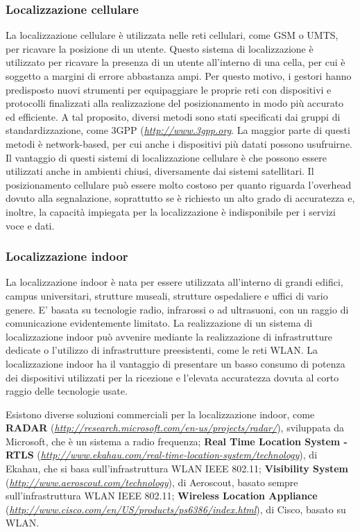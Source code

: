 \subsubsection{Localizzazione cellulare}
La localizzazione cellulare è utilizzata nelle reti cellulari, come GSM o UMTS, per ricavare la posizione di un utente.
Questo sistema di localizzazione è utilizzato per ricavare la presenza di un utente all'interno di una cella, per cui è soggetto a margini di errore abbastanza ampi.
Per questo motivo, i gestori hanno predisposto nuovi strumenti per equipaggiare le proprie reti con dispositivi e protocolli finalizzati alla realizzazione del posizionamento in modo più accurato ed efficiente.
A tal proposito, diversi metodi sono stati specificati dai gruppi di standardizzazione, come 3GPP (\emph{\url{http://www.3gpp.org}}. La maggior parte di questi metodi è network-based, per cui anche i dispositivi più datati possono usufruirne.
Il vantaggio di questi sistemi di localizzazione cellulare è che possono essere utilizzati anche in ambienti chiusi, diversamente dai sistemi satellitari.
Il posizionamento cellulare può essere molto costoso per quanto riguarda l'overhead dovuto alla segnalazione, soprattutto se è richiesto un alto grado  di accuratezza e, inoltre, la capacità impiegata per la localizzazione è indisponibile per i servizi voce e dati.

\subsubsection{Localizzazione indoor}
La localizzazione indoor è nata per essere utilizzata all'interno di grandi edifici, campus universitari, strutture museali, strutture ospedaliere e uffici di vario genere.
E' basata su tecnologie radio, infrarossi o ad ultrasuoni, con un raggio di comunicazione evidentemente limitato.
La realizzazione di un sistema di localizzazione indoor può avvenire mediante la realizzazione di infrastrutture dedicate o l'utilizzo di infrastrutture preesistenti, come le reti WLAN.
La localizzazione indoor ha il vantaggio di presentare un basso consumo di potenza dei dispositivi utilizzati per la ricezione e l'elevata accuratezza dovuta al corto raggio delle tecnologie usate.

Esistono diverse soluzioni commerciali per la localizzazione indoor, come \textbf{RADAR} (\emph{\url{http://research.microsoft.com/en-us/projects/radar/}}), sviluppata da Microsoft, che è un sistema a radio frequenza; \textbf{Real Time Location System - RTLS} (\emph{\url{http://www.ekahau.com/real-time-location-system/technology}}), di Ekahau, che si basa sull'infrastruttura WLAN IEEE 802.11; \textbf{Visibility System} (\emph{\url{http://www.aeroscout.com/technology}}), di Aeroscout, basato sempre sull'infrastruttura WLAN IEEE 802.11; \textbf{Wireless Location Appliance} (\emph{\url{http://www.cisco.com/en/US/products/ps6386/index.html}}), di Cisco, basato su WLAN.\\


